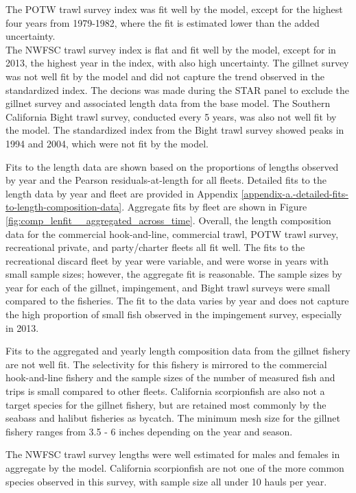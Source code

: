 \documentclass[12pt,]{article}
\begin{document}
The POTW trawl survey index was fit well by the model, except for the
highest four years from 1979-1982, where the fit is estimated lower than
the added uncertainty.\\
The NWFSC trawl survey index is flat and fit well by the model, except
for in 2013, the highest year in the index, with also high uncertainty.
The gillnet survey was not well fit by the model and did not capture the
trend observed in the standardized index. The decions was made during
the STAR panel to exclude the gillnet survey and associated length data
from the base model. The Southern California Bight trawl survey,
conducted every 5 years, was also not well fit by the model. The
standardized index from the Bight trawl survey showed peaks in 1994 and
2004, which were not fit by the model.

Fits to the length data are shown based on the proportions of lengths
observed by year and the Pearson residuals-at-length for all fleets.
Detailed fits to the length data by year and fleet are provided in
Appendix \ref{appendix-a.-detailed-fits-to-length-composition-data}.
Aggregate fits by fleet are shown in Figure
\ref{fig:comp_lenfit__aggregated_across_time}. Overall, the length
composition data for the commercial hook-and-line, commercial trawl,
POTW trawl survey, recreational private, and party/charter fleets all
fit well. The fits to the recreational discard fleet by year were
variable, and were worse in years with small sample sizes; however, the
aggregate fit is reasonable. The sample sizes by year for each of the
gillnet, impingement, and Bight trawl surveys were small compared to the
fisheries. The fit to the data varies by year and does not capture the
high proportion of small fish observed in the impingement survey,
especially in 2013.

Fits to the aggregated and yearly length composition data from the
gillnet fishery are not well fit. The selectivity for this fishery is
mirrored to the commercial hook-and-line fishery and the sample sizes of
the number of measured fish and trips is small compared to other fleets.
California scorpionfish are also not a target species for the gillnet
fishery, but are retained most commonly by the seabass and halibut
fisheries as bycatch. The minimum mesh size for the gillnet fishery
ranges from 3.5 - 6 inches depending on the year and season.

The NWFSC trawl survey lengths were well estimated for males and females
in aggregate by the model. California scorpionfish are not one of the
more common species observed in this survey, with sample size all under
10 hauls per year.
\end{document}
